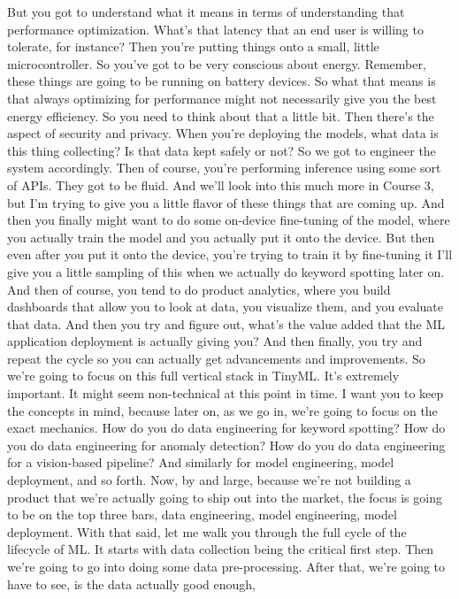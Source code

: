 But you got to understand what it means in terms of understanding
that performance optimization.
What's that latency that an end user is willing to tolerate, for instance?
Then you're putting things onto a small, little microcontroller.
So you've got to be very conscious about energy.
Remember, these things are going to be running on battery devices.
So what that means is that always optimizing for performance
might not necessarily give you the best energy efficiency.
So you need to think about that a little bit.
Then there's the aspect of security and privacy.
When you're deploying the models, what data is this thing collecting?
Is that data kept safely or not?
So we got to engineer the system accordingly.
Then of course, you're performing inference using some sort of APIs.
They got to be fluid.
And we'll look into this much more in Course 3,
but I'm trying to give you a little flavor of these things that
are coming up.
And then you finally might want to do some on-device fine-tuning
of the model, where you actually train the model
and you actually put it onto the device.
But then even after you put it onto the device,
you're trying to train it by fine-tuning it
I'll give you a little sampling of this when we actually
do keyword spotting later on.
And then of course, you tend to do product analytics,
where you build dashboards that allow you to look at data,
you visualize them, and you evaluate that data.
And then you try and figure out, what's the value
added that the ML application deployment is actually giving you?
And then finally, you try and repeat the cycle so you can actually
get advancements and improvements.
So we're going to focus on this full vertical stack in TinyML.
It's extremely important.
It might seem non-technical at this point in time.
I want you to keep the concepts in mind, because later on, as we go in,
we're going to focus on the exact mechanics.
How do you do data engineering for keyword spotting?
How do you do data engineering for anomaly detection?
How do you do data engineering for a vision-based pipeline?
And similarly for model engineering, model deployment, and so forth.
Now, by and large, because we're not building a product that we're actually
going to ship out into the market, the focus
is going to be on the top three bars, data engineering, model engineering,
model deployment.
With that said, let me walk you through the full cycle of the lifecycle of ML.
It starts with data collection being the critical first step.
Then we're going to go into doing some data pre-processing.
After that, we're going to have to see, is the data actually good enough,
